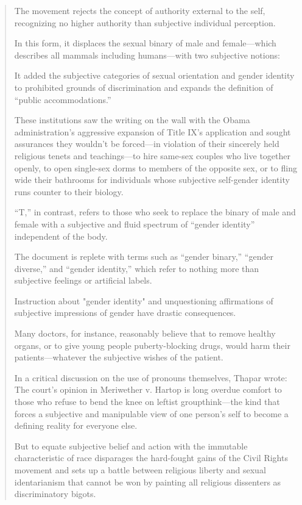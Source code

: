 \documentclass[11pt]{article}
\begin{document}
\begin{quote}
The movement rejects the concept of authority external to the self, recognizing no higher authority than subjective individual perception.

In this form, it displaces the sexual binary of male and female—which describes all mammals including humans—with two subjective notions:

It added the subjective categories of sexual orientation and gender identity to prohibited grounds of discrimination and expands the definition of “public accommodations.”

These institutions saw the writing on the wall with the Obama administration’s aggressive expansion of Title IX’s application and sought assurances they wouldn’t be forced—in violation of their sincerely held religious tenets and teachings—to hire same-sex couples who live together openly, to open single-sex dorms to members of the opposite sex, or to fling wide their bathrooms for individuals whose subjective self-gender identity runs counter to their biology.

“T,” in contrast, refers to those who seek to replace the binary of male and female with a subjective and fluid spectrum of “gender identity” independent of the body.

The document is replete with terms such as “gender binary,” “gender diverse,” and “gender identity,” which refer to nothing more than subjective feelings or artificial labels.

Instruction about "gender identity" and unquestioning affirmations of subjective impressions of gender have drastic consequences.

Many doctors, for instance, reasonably believe that to remove healthy organs, or to give young people puberty-blocking drugs, would harm their patients—whatever the subjective wishes of the patient.

In a critical discussion on the use of pronouns themselves, Thapar wrote: The court’s opinion in Meriwether v. Hartop is long overdue comfort to those who refuse to bend the knee on leftist groupthink—the kind that forces a subjective and manipulable view of one person’s self to become a defining reality for everyone else.

But to equate subjective belief and action with the immutable characteristic of race disparages the hard-fought gains of the Civil Rights movement and sets up a battle between religious liberty and sexual identarianism that cannot be won by painting all religious dissenters as discriminatory bigots.


\end{quote}
\end{document}
